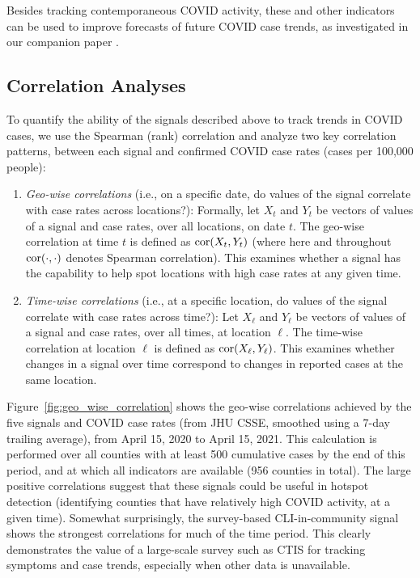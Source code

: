 \documentclass[11pt]{article}
\begin{document}
Besides tracking contemporaneous COVID activity, these and other indicators can
be used to improve forecasts of future COVID case trends, as investigated in our
companion paper \cite{McDonald:2021}.

\subsection{Correlation Analyses}

To quantify the ability of the signals described above to track trends in COVID
cases, we use the Spearman (rank) correlation and analyze two key correlation
patterns, between each signal and confirmed COVID case rates (cases per 100,000
people):

\begin{enumerate}
\item \textit{Geo-wise correlations} (i.e., on a specific date, do values of the
  signal correlate with case rates across locations?): Formally, let $X_t$ and
  $Y_t$ be vectors of values of a signal and case rates, over all locations, on
  date $t$. The geo-wise correlation at time $t$ is defined as $\mathrm{cor}(X_t,
  Y_t)$ (where here and throughout $\mathrm{cor}(\cdot,\cdot)$ denotes Spearman
  correlation). This examines whether a signal has the capability to help spot
  locations with high case rates at any given time.

\item \textit{Time-wise correlations} (i.e., at a specific location, do values
  of the signal correlate with case rates across time?): Let $X_\ell$
  and $Y_\ell$ be vectors of values of a signal and case rates, over all
  times, at location $\ell$. The time-wise correlation at location $\ell$ is
  defined as $\mathrm{cor}(X_\ell, Y_\ell)$. This examines whether changes in a signal
  over time correspond to changes in reported cases at the same
  location.
\end{enumerate}

Figure~\ref{fig:geo_wise_correlation} shows the geo-wise correlations achieved
by the five signals and COVID case rates (from JHU CSSE, smoothed using a 7-day
trailing average), from April 15, 2020 to April 15, 2021. This calculation is
performed over all counties with at least 500 cumulative cases by the end of
this period, and at which all indicators are available (956 counties in total).
The large positive correlations suggest that these signals could be useful in
hotspot detection (identifying counties that have relatively high COVID
activity, at a given time). Somewhat surprisingly, the survey-based
CLI-in-community signal shows the strongest correlations for much of the time
period. This clearly demonstrates the value of a large-scale survey such as CTIS
for tracking symptoms and case trends, especially when other data is
unavailable.
\end{document}
